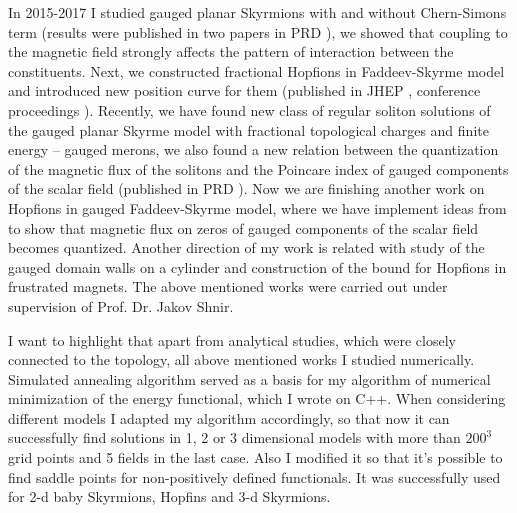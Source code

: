 \documentclass[paper=a4,fontsize=11pt]{scrartcl} %
\begin{document}
In 2015-2017 I studied gauged planar Skyrmions with and without Chern-Simons term (results were published in two papers in PRD \cite{GaugedBaby,GaugedBabyCS}), we showed that coupling to the magnetic field strongly affects the pattern of interaction between the constituents. Next, we constructed fractional Hopfions in Faddeev-Skyrme model and introduced new position curve for them (published in JHEP \cite{FractionalHopf}, conference proceedings \cite{SkyrmeFamily}). Recently, we have found new class of regular soliton solutions of the gauged planar Skyrme model with fractional topological charges and finite energy -- gauged merons, we also found a new relation between the quantization of the magnetic flux of the solitons and the Poincare index of gauged components of the scalar field (published in PRD \cite{GaugedMerons}). Now we are finishing another work on Hopfions in gauged Faddeev-Skyrme model, where we have implement ideas from \cite{GaugedMerons} to show that magnetic flux on zeros of gauged components of the scalar field becomes quantized. Another direction of my work is related with study of the gauged domain walls on a cylinder and construction of the bound for Hopfions in frustrated magnets. The above mentioned works were carried out under supervision of Prof. Dr. Jakov Shnir.

I want to highlight that apart from analytical studies, which were closely connected to the topology, all above mentioned works I studied numerically. Simulated annealing algorithm served as a basis for my algorithm of numerical minimization of the energy functional, which I wrote on C++. When considering different models I adapted my algorithm accordingly, so that now it can successfully find solutions in 1, 2 or 3 dimensional models with more than $200^3$ grid points and 5 fields in the last case. Also I modified it so that it's possible to find saddle points for non-positively defined functionals. It was successfully used for 2-d baby Skyrmions, Hopfins and 3-d Skyrmions.



%
\end{document}
